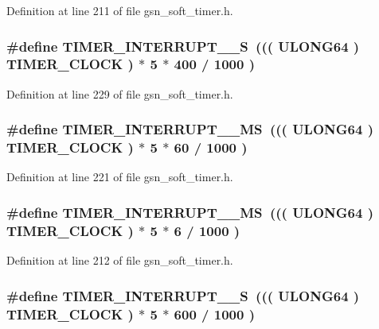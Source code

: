 Definition at line 211 of file gsn\_\-soft\_\-timer.h.

\hypertarget{a00673_gabe6b8cc50a953b9686cec098e74ab340}{
\subsubsection[{TIMER\_\-INTERRUPT\_\-2\_\-S}]{\setlength{\rightskip}{0pt plus 5cm}\#define TIMER\_\-INTERRUPT\_\_\-S~((( {\bf ULONG64} ) TIMER\_\-CLOCK ) $\ast$ 5 $\ast$ 400 / 1000 )}}
\label{a00673_gabe6b8cc50a953b9686cec098e74ab340}


Definition at line 229 of file gsn\_\-soft\_\-timer.h.

\hypertarget{a00673_gaa4940d6bdf476029bda023939a17b096}{
\subsubsection[{TIMER\_\-INTERRUPT\_\-300\_\-MS}]{\setlength{\rightskip}{0pt plus 5cm}\#define TIMER\_\-INTERRUPT\_\_\-MS~((( {\bf ULONG64} ) TIMER\_\-CLOCK ) $\ast$ 5 $\ast$ 60 / 1000 )}}
\label{a00673_gaa4940d6bdf476029bda023939a17b096}


Definition at line 221 of file gsn\_\-soft\_\-timer.h.

\hypertarget{a00673_gac9f2593e6b663668cd0d1420e4a5f609}{
\subsubsection[{TIMER\_\-INTERRUPT\_\-30\_\-MS}]{\setlength{\rightskip}{0pt plus 5cm}\#define TIMER\_\-INTERRUPT\_\_\-MS~((( {\bf ULONG64} ) TIMER\_\-CLOCK ) $\ast$ 5 $\ast$ 6 / 1000 )}}
\label{a00673_gac9f2593e6b663668cd0d1420e4a5f609}


Definition at line 212 of file gsn\_\-soft\_\-timer.h.

\hypertarget{a00673_gaf80325273d8e20207f0914fd0c8b89ec}{
\subsubsection[{TIMER\_\-INTERRUPT\_\-3\_\-S}]{\setlength{\rightskip}{0pt plus 5cm}\#define TIMER\_\-INTERRUPT\_\_\-S~((( {\bf ULONG64} ) TIMER\_\-CLOCK ) $\ast$ 5 $\ast$ 600 / 1000 )}}
\label{a00673_gaf80325273d8e20207f0914fd0c8b89ec}


